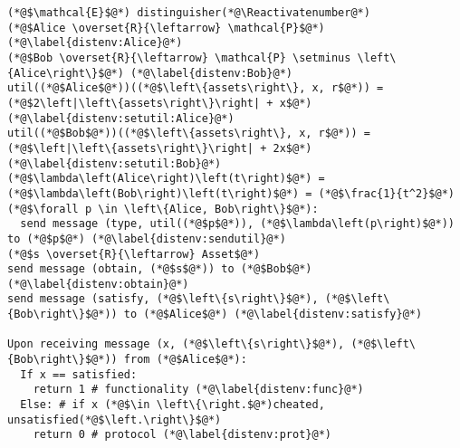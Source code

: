 \Suppressnumber
\begin{lstlisting}[label=distenv, style=numbers]
(*@$\mathcal{E}$@*) distinguisher(*@\Reactivatenumber@*)
(*@$Alice \overset{R}{\leftarrow} \mathcal{P}$@*) (*@\label{distenv:Alice}@*)
(*@$Bob \overset{R}{\leftarrow} \mathcal{P} \setminus \left\{Alice\right\}$@*) (*@\label{distenv:Bob}@*)
util((*@$Alice$@*))((*@$\left\{assets\right\}, x, r$@*)) = (*@$2\left|\left\{assets\right\}\right| + x$@*) (*@\label{distenv:setutil:Alice}@*)
util((*@$Bob$@*))((*@$\left\{assets\right\}, x, r$@*)) = (*@$\left|\left\{assets\right\}\right| + 2x$@*) (*@\label{distenv:setutil:Bob}@*)
(*@$\lambda\left(Alice\right)\left(t\right)$@*) = (*@$\lambda\left(Bob\right)\left(t\right)$@*) = (*@$\frac{1}{t^2}$@*)
(*@$\forall p \in \left\{Alice, Bob\right\}$@*):
  send message (type, util((*@$p$@*)), (*@$\lambda\left(p\right)$@*)) to (*@$p$@*) (*@\label{distenv:sendutil}@*)
(*@$s \overset{R}{\leftarrow} Asset$@*)
send message (obtain, (*@$s$@*)) to (*@$Bob$@*) (*@\label{distenv:obtain}@*)
send message (satisfy, (*@$\left\{s\right\}$@*), (*@$\left\{Bob\right\}$@*)) to (*@$Alice$@*) (*@\label{distenv:satisfy}@*)

Upon receiving message (x, (*@$\left\{s\right\}$@*), (*@$\left\{Bob\right\}$@*)) from (*@$Alice$@*):
  If x == satisfied:
    return 1 # functionality (*@\label{distenv:func}@*)
  Else: # if x (*@$\in \left\{\right.$@*)cheated, unsatisfied(*@$\left.\right\}$@*)
    return 0 # protocol (*@\label{distenv:prot}@*)
\end{lstlisting}
